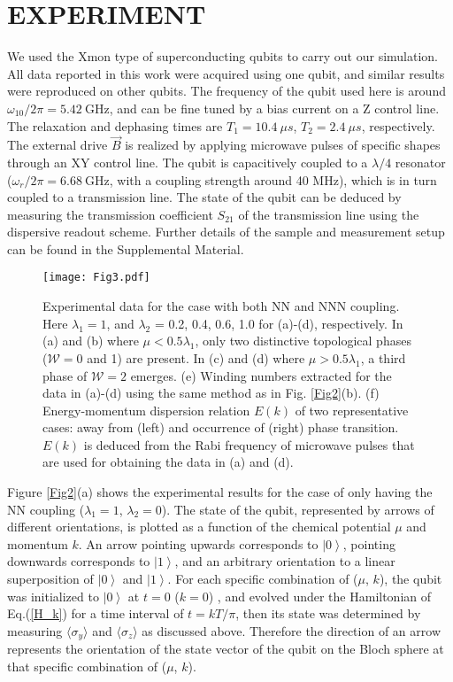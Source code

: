 \documentclass[aps,reprint,groupedaddress,showpacs,superscriptaddress]{revtex4-1}
\newcommand{\ket}[1]{\left| #1 \right>} %
\begin{document}
\section{EXPERIMENT}
We used the Xmon type of superconducting qubits to carry out our simulation. All data reported in this work were acquired using one qubit, and similar results were reproduced on other qubits. The frequency of the qubit used here is around $\omega_{10}/2\pi = 5.42~ \mathrm{GHz}$, and can be fine tuned by a bias current on a Z control line. The relaxation and dephasing times are $T_1 = 10.4~\mu s$, $T_2 =  2.4 ~\mu s$, respectively. The external drive $\vec{B}$ is realized by applying microwave pulses of specific shapes through an XY control line. The qubit is capacitively coupled to a $\lambda/4$ resonator ($\omega_{r} /2\pi= 6.68~ \mathrm{GHz}$, with a coupling strength around 40 MHz), which is in turn coupled to a transmission line. The state of the qubit can be deduced by measuring the transmission coefficient $S_{21}$ of the transmission line using the dispersive readout scheme. Further details of the sample and measurement setup can be found in the Supplemental Material. 

\begin{figure*}[!htbp]
	\centering
	\texttt{[image: Fig3.pdf]}
	\caption{Experimental data for the case with both NN and NNN coupling. Here $\lambda_{1} = 1$, and $\lambda_{2}$ = 0.2, 0.4, 0.6, 1.0 for (a)-(d), respectively. In (a) and (b) where $\mu<0.5\lambda_{1}$, only two distinctive topological phases ($\mathcal{W}=0$ and 1) are present. In (c) and (d) where $\mu>0.5\lambda_{1}$, a third phase of $\mathcal{W}=2$ emerges. (e) Winding numbers extracted for the data in (a)-(d) using the same method as in Fig. \ref{Fig2}(b). (f) Energy-momentum dispersion relation $E(k)$ of two representative cases: away from (left) and occurrence of (right) phase transition. $E(k)$ is deduced from the Rabi frequency of microwave pulses that are used for obtaining the data in (a) and (d).}\label{Fig3}
\end{figure*} 

Figure \ref{Fig2}(a) shows the experimental results for the case of only having the NN coupling ($\lambda_{1}=1$, $\lambda_{2}=0$). The state of the qubit, represented by arrows of different orientations, is plotted as a function of the chemical potential $\mu$ and momentum $k$. An arrow pointing upwards corresponds to $\ket{0}$, pointing downwards corresponds to $\ket{1}$, and an arbitrary orientation to a linear superposition of $\ket{0}$ and $\ket{1}$. For each specific combination of ($\mu$, $k$), the qubit was initialized to $\ket{0}$ at $t=0$ ($k=0$) , and evolved under the Hamiltonian of Eq.(\ref*{H_k}) for a time interval of $t=kT/\pi$, then its state was determined by measuring $\langle\sigma_{y}\rangle$ and $\langle\sigma_{z}\rangle$ as discussed above. Therefore the direction of an arrow represents the orientation of the state vector of the qubit on the Bloch sphere at that specific combination of ($\mu$, $k$). 
\end{document}
